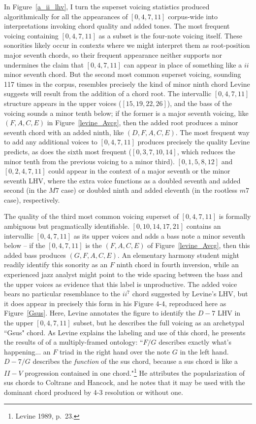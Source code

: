 In Figure~\ref{a_ii_lhv}, I turn the superset voicing statistics produced algorithmically for all the appearances of $[0,4,7,11]$ corpus-wide into interpretations invoking chord quality and added tones.  The most frequent voicing containing $[0,4,7,11]$ as a subset is the four-note voicing itself.  These sonorities likely occur in contexts where we might interpret them as root-position major seventh chords, so their frequent appearance neither supports nor undermines the claim that $[0,4,7,11]$ can appear in place of something like a $ii$ minor seventh chord.  But the second most common superset voicing, sounding 117 times in the corpus, resembles precisely the kind of minor ninth chord Levine suggests will result from the addition of a chord root.  The intervallic $[0,4,7,11]$ structure appears in the upper voices ($[15,19,22,26]$), and the bass of the voicing sounds a minor tenth below; if the former is a major seventh voicing, like $(F,A,C,E)$ in Figure~\ref{levine_Avcg}, then the added root produces a minor seventh chord with an added ninth, like $(D,F,A,C,E)$.  The most frequent way to add any additional voices to $[0,4,7,11]$ produces precisely the quality Levine predicts, as does the sixth most frequent ($[0,3,7,10,14]$, which reduces the minor tenth from the previous voicing to a minor third).  $[0,1,5,8,12]$ and $[0,2,4,7,11]$ could appear in the context of a major seventh or the minor seventh LHV, where the extra voice functions as a doubled seventh and added second (in the $M7$ case) or doubled ninth and added eleventh (in the rootless $m7$ case), respectively.

The quality of the third most common voicing superset of $[0,4,7,11]$ is formally ambiguous but pragmatically identifiable.  $[0,10,14,17,21]$ contains an intervallic $[0,4,7,11]$ as its upper voices and adds a bass note a minor seventh below -- if the $[0,4,7,11]$ is the $(F,A,C,E)$ of Figure~\ref{levine_Avcg}, then this added bass produces $(G,F,A,C,E)$.  An elementary harmony student might readily identify this sonority as an $F$ ninth chord in fourth inversion, while an experienced jazz analyst might point to the wide spacing between the bass and the upper voices as evidence that this label is unproductive.  The added voice bears no particular resemblance to the $ii^7$ chord suggested by Levine's LHV, but it does appear in precisely this form in his Figure 4-4, reproduced here as Figure~\ref{Gsus}.  Here, Levine annotates the figure to identify the $D-7$ LHV in the upper $[0,4,7,11]$ subset, but he describes the full voicing as an archetypal ``Gsus" chord.  As Levine explains the labeling and use of this chord, he presents the results of of a multiply-framed ontology: ``$F/G$ describes exactly what's happening... an $F$ triad in the right hand over the note $G$ in the left hand.  $D-7/G$ describes the \emph{function} of the sus chord, because a sus chord is like a $II-V$ progression contained in one chord."\footnote{Levine 1989, p.\ 23.}  He attributes the popularization of sus chords to Coltrane and Hancock, and he notes that it may be used with the dominant chord produced by 4-3 resolution or without one.

